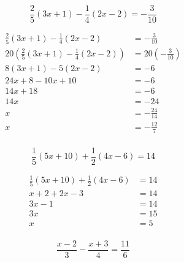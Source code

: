 \documentclass[letterpaper, landscape]{exam}
\begin{document}
\begin{questions}
    \question[7]
      \[ 
        \frac{2}{5}(3x + 1) - \frac{1}{4}(2x - 2) = -\frac{3}{10} 
      \]

      \begin{solution}
        \begin{align*}
          \frac{2}{5}(3x + 1) - \frac{1}{4}(2x - 2)                   & = -\frac{3}{10} \\
          20 \left( \frac{2}{5}(3x + 1) - \frac{1}{4}(2x - 2) \right) & = 20 \left( -\frac{3}{10} \right) \\
          8(3x + 1) - 5(2x - 2)                                       & = -6 \\
          24x + 8 - 10x + 10                                          & = -6 \\
          14x + 18                                                    & = -6 \\
          14x                                                         & = -24 \\
          x                                                           & = -\frac{24}{14} \\
          x                                                           & = -\frac{12}{7} \\
        \end{align*}
      \end{solution}

    \question[7]
      \[ 
        \frac{1}{5}(5x + 10) + \frac{1}{2}(4x - 6) = 14 
      \]
      \begin{solution}
        \begin{align*}
          \frac{1}{5}(5x + 10) + \frac{1}{2}(4x - 6) & = 14 \\
          x + 2 + 2x - 3                             & = 14 \\
          3x - 1                                     & = 14 \\
          3x                                         & = 15 \\
          x                                          & = 5 \\
        \end{align*}
      \end{solution}

    \question[7]
      \[ 
        \frac{x - 2}{3} - \frac{x + 3}{4} = \frac{11}{6} 
      \]


\end{questions}
\end{document}
